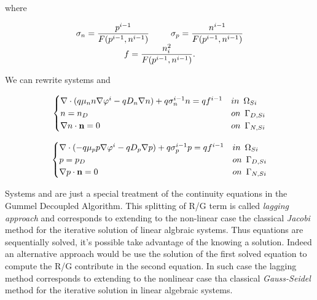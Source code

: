 where


\begin{equation}
\begin{array}{c}
\sigma_n  = \dfrac{p^{i-1}}{F(p^{i-1},n^{i-1})} \psp{15} \sigma_p   = \dfrac{n^{i-1}}{F(p^{i-1},n^{i-1})} \\
f  = \dfrac{n_i^2}{F(p^{i-1},n^{i-1})}.
\end{array}
\end{equation}

We can rewrite systems  and 

\begin{equation}
\label{eq: LEC system new}
\begin{cases}
 \nabla \cdot ( q\mu_n n \nabla \varphi^i - qD_n \nabla n ) +q\sigma_n^{i-1} n = qf^{i-1} & in \psp{3} \Omega_{Si}
 \\
 n = n_D & on \psp{3} \Gamma_{D,Si}
 \\
 \nabla n \cdot \vect{n} = 0 & on \psp{3} \Gamma_{N,Si}
\end{cases}
\end{equation}

\begin{equation}
\label{eq: LHC system new}
\begin{cases}
\nabla \cdot (- q\mu_p p \nabla \varphi^i - qD_p \nabla p ) + q\sigma_p^{i-1} p =  qf^{i-1}& in \psp{3} \Omega_{Si}
\\
 p = p_D & on \psp{3} \Gamma_{D,Si}
 \\
 \nabla p \cdot \vect{n} = 0 & on \psp{3} \Gamma_{N,Si}
\end{cases}
\end{equation}

Systems  and  are just a special treatment of the continuity equations in the Gummel Decoupled Algorithm. This splitting of R/G term is called \textit{lagging approach} and corresponds to extending to the non-linear case the classical \textit{Jacobi} method for the iterative  solution of linear algbraic systems. Thus equations are sequentially solved, it's possible take advantage of the knowing a solution. Indeed an alternative approach would be use the solution of the first solved equation to compute the R/G contribute in the second equation. In such case the lagging method corresponds to extending to the nonlinear case tha classical \textit{Gauss-Seidel} method for the iterative solution in linear algebraic systems.


